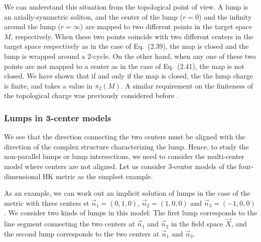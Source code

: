 \documentclass[a4paper,12pt]{article}
\begin{document}
We can understand this situation from the topological point of view. 
A lump is an axially-symmetric soliton, 
and the center of the lump ($r=0$) and 
the infinity around the lump ($r=\infty$) are mapped 
to two different points in the target space $M$, 
respectively.  
When these two points coincide with 
two different centers in the target space respectively as 
in the case of Eq.~(2.39), the map is closed  
and the lump is wrapped around a $2$-cycle. 
On the other hand, when any one of these two points are not mapped to 
a center as in the case of Eq.~(2.41), 
the map is not closed. 
We have shown that if and only if the map is closed, 
the the lump charge is finite, and takes a value in $\pi_2(M)$.  
A similar requirement on the finiteness of the topological charge 
was previously considered before \cite{DLD,Abraham}. 

\subsubsection{Lumps in 3-center models}
We see that the direction connecting the two centers 
must be aligned with  the direction of the complex structure 
characterizing the lump. 
Hence, to study the non-parallel lumps or lump intersections,  
we need to consider the multi-center model 
where centers are not aligned. 
Let us consider 3-center models of the four-dimensional HK metric as 
the simplest example.

As an example, we can work out an implicit solution of  
lumps in the case of the metric with three centers st 
$\vec{n}_1=(0,1,0)$, $\vec{n}_2 =(1,0,0)$ and $\vec{n}_3=(-1,0,0)$.
We consider two kinds of lumps in this model: 
The first lump corresponds to 
the line segment connecting the two centers at 
$\vec{n}_1$ and $\vec{n}_2$ in the 
field space $\vec{X}$, 
and the second lump corresponds to the two centers at 
$\vec{n}_1$ and $\vec{n}_3$. 
\end{document}
